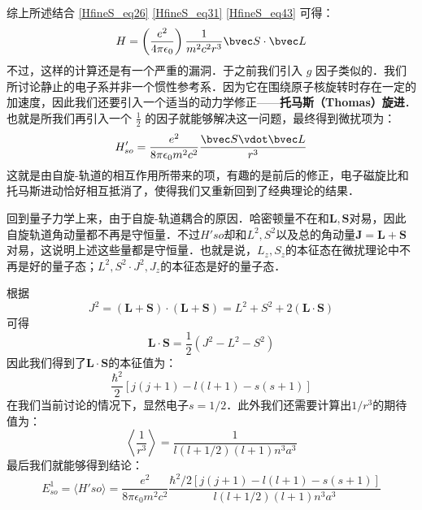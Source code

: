 综上所述结合 \autoref{HfineS_eq26} \autoref{HfineS_eq31} \autoref{HfineS_eq43} 可得：
\begin{equation}
H=\left(\frac{e^2}{4\pi\epsilon_0}\right)\frac{1}{m^2c^2r^3}\bvec S \cdot \bvec L
\end{equation}
不过，这样的计算还是有一个严重的漏洞．于之前我们引入 $g$ 因子类似的．我们所讨论静止的电子系并非一个惯性参考系．因为它在围绕原子核旋转时存在一定的加速度，因此我们还要引入一个适当的动力学修正——\textbf{托马斯（Thomas）旋进}．也就是所我们再引入一个 $\frac{1}{2}$ 的因子就能够解决这一问题，最终得到微扰项为：
\begin{equation}
H'_{so} = \frac{e^2}{8\pi \epsilon_0 m^2 c^2} \frac{\bvec S \vdot \bvec L}{r^3}
\end{equation}
这就是由自旋-轨道的相互作用所带来的项，有趣的是前后的修正，电子磁旋比和托马斯进动恰好相互抵消了，使得我们又重新回到了经典理论的结果．

回到量子力学上来，由于自旋-轨道耦合的原因．哈密顿量不在和$\mathbf{L,S}$对易，因此自旋轨道角动量都不再是守恒量．不过$H'{so}$却和$L^2,S^2$以及总的角动量$\mathbf{J=L+S}$对易，这说明上述这些量都是守恒量．也就是说，$L_z,S_z$的本征态在微扰理论中不再是好的量子态；$L^2,S^2\cdot J^2,J_z$的本征态是好的量子态．

根据
\begin{equation}
J^2 = (\mathbf{L+S})\cdot(\mathbf{L+S})=L^2+S^2+2(\mathbf{L\cdot S})
\end{equation}
可得
\begin{equation}
\mathbf{L\cdot S}=\frac{1}{2}(J^2-L^2-S^2)
\end{equation}
因此我们得到了$\mathbf{L\cdot S}$的本征值为：
\begin{equation}
\frac{\hbar^2}{2}[j(j+1)-l(l+1)-s(s+1)]
\end{equation}
在我们当前讨论的情况下，显然电子$s=1/2$．此外我们还需要计算出$1/r^3$的期待值为：
\begin{equation}
\left\langle \frac{1}{r^3}\right\rangle = \frac{1}{l(l+1/2)(l+1)n^3a^3}
\end{equation}
最后我们就能够得到结论：
\begin{equation}
E^1_{so}=\langle H'{so}\rangle = \frac{e^2}{8\pi \epsilon_0 m^2 c^2}\frac{\hbar^2/2[j(j+1)-l(l+1)-s(s+1)]}{l(l+1/2)(l+1)n^3a^3}
\end{equation}






